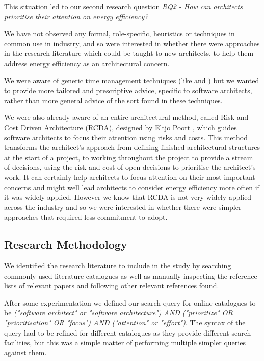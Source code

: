 This situation led to our second research question \emph{RQ2 - How can architects prioritise their attention on energy efficiency?}

We have not observed any formal, role-specific, heuristics or techniques in common use in industry, and so were interested in whether there were approaches in the research literature which could be taught to new architects, to help them address energy efficiency as an architectural concern.  

We were aware of generic time management techniques (like \cite{allen2015-gettingthingsdone} and \cite{koch1998-8020principle}) but we wanted to provide more tailored and prescriptive advice, specific to software architects, rather than more general advice of the sort found in these techniques.

We were also already aware of an entire architectural method, called Risk and Cost Driven Architecture (RCDA), designed by Eltjo Poort \cite{poort2012-rcda}, which guides software architects to focus their attention using risks and costs.  This method transforms the architect's approach from defining finished architectural structures at the start of a project, to working throughout the project to provide a stream of decisions, using the risk and cost of open decisions to prioritise the architect's work. It can certainly help architects to focus attention on their most important concerns and might well lead architects to consider energy efficiency more often if it was widely applied.  However we know that RCDA is not very widely applied across the industry and so we were interested in whether there were simpler approaches that required less commitment to adopt.

\subsection{Research Methodology}

We identified the research literature to include in the study by searching commonly used literature catalogues as well as manually inspecting the reference lists of relevant papers and following other relevant references found.

After some experimentation we defined our search query for online catalogues to be \emph{("software architect" or "software architecture") AND ("prioritize" OR "prioritisation" OR "focus") AND ("attention" or "effort")}.  The syntax of the query had to be refined for different catalogues as they provide different search facilities, but this was a simple matter of performing multiple simpler queries against them.

